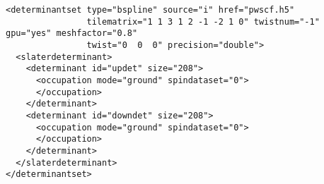 
\begin{lstlisting}[caption=All electron Hamiltonian XML element.\label{listing:splineSPOs}]
<determinantset type="bspline" source="i" href="pwscf.h5"
                tilematrix="1 1 3 1 2 -1 -2 1 0" twistnum="-1" gpu="yes" meshfactor="0.8"
                twist="0  0  0" precision="double">
  <slaterdeterminant>
    <determinant id="updet" size="208">
      <occupation mode="ground" spindataset="0">
      </occupation>
    </determinant>
    <determinant id="downdet" size="208">
      <occupation mode="ground" spindataset="0">
      </occupation>
    </determinant>
  </slaterdeterminant>
</determinantset>
\end{lstlisting}


\label{sec:splinebasis}
